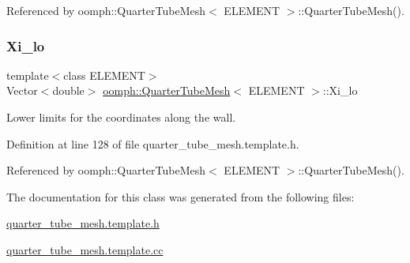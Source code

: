 Referenced by oomph\+::\+Quarter\+Tube\+Mesh$<$ E\+L\+E\+M\+E\+N\+T $>$\+::\+Quarter\+Tube\+Mesh().

\mbox{\label{classoomph_1_1QuarterTubeMesh_a323243990ecc860e5083d205c1ab247c}} 
\subsubsection{\texorpdfstring{Xi\+\_\+lo}{Xi\_lo}}
{\footnotesize\ttfamily template$<$class E\+L\+E\+M\+E\+NT$>$ \\
Vector$<$double$>$ \hyperlink{classoomph_1_1QuarterTubeMesh}{oomph\+::\+Quarter\+Tube\+Mesh}$<$ E\+L\+E\+M\+E\+NT $>$\+::Xi\+\_\+lo\hspace{0.3cm}{\ttfamily [protected]}}



Lower limits for the coordinates along the wall. 



Definition at line 128 of file quarter\+\_\+tube\+\_\+mesh.\+template.\+h.



Referenced by oomph\+::\+Quarter\+Tube\+Mesh$<$ E\+L\+E\+M\+E\+N\+T $>$\+::\+Quarter\+Tube\+Mesh().



The documentation for this class was generated from the following files\+:\begin{DoxyCompactItemize}
\item 
\hyperlink{quarter__tube__mesh_8template_8h}{quarter\+\_\+tube\+\_\+mesh.\+template.\+h}\item 
\hyperlink{quarter__tube__mesh_8template_8cc}{quarter\+\_\+tube\+\_\+mesh.\+template.\+cc}\end{DoxyCompactItemize}
